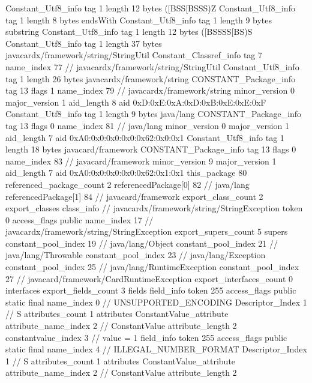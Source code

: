 {{{		}
		Constant_Utf8_info {
			tag	1
			length	12
			bytes	([BSS[BSSS)Z
		}
		Constant_Utf8_info {
			tag	1
			length	8
			bytes	endsWith
		}
		Constant_Utf8_info {
			tag	1
			length	9
			bytes	substring
		}
		Constant_Utf8_info {
			tag	1
			length	12
			bytes	([BSSSS[BS)S
		}
		Constant_Utf8_info {
			tag	1
			length	37
			bytes	javacardx/framework/string/StringUtil
		}
		Constant_Classref_info {
			tag	7
			name_index	77		// javacardx/framework/string/StringUtil
		}
		Constant_Utf8_info {
			tag	1
			length	26
			bytes	javacardx/framework/string
		}
		CONSTANT_Package_info {
			tag	13
			flags	1
			name_index	79		// javacardx/framework/string
			minor_version	0
			major_version	1
			aid_length	8
			aid	0xD:0xE:0xA:0xD:0xB:0xE:0xE:0xF
		}
		Constant_Utf8_info {
			tag	1
			length	9
			bytes	java/lang
		}
		CONSTANT_Package_info {
			tag	13
			flags	0
			name_index	81		// java/lang
			minor_version	0
			major_version	1
			aid_length	7
			aid	0xA0:0x0:0x0:0x0:0x62:0x0:0x1
		}
		Constant_Utf8_info {
			tag	1
			length	18
			bytes	javacard/framework
		}
		CONSTANT_Package_info {
			tag	13
			flags	0
			name_index	83		// javacard/framework
			minor_version	9
			major_version	1
			aid_length	7
			aid	0xA0:0x0:0x0:0x0:0x62:0x1:0x1
		}
	}
	this_package	80
	referenced_package_count	2
	referencedPackage[0]	82		// java/lang
	referencedPackage[1]	84		// javacard/framework
	export_class_count	2
	export_classes {
		class_info {		// javacardx/framework/string/StringException
			token	0
			access_flags	public
			name_index	17		// javacardx/framework/string/StringException
			export_supers_count	5
			supers {
				constant_pool_index	19		// java/lang/Object
				constant_pool_index	21		// java/lang/Throwable
				constant_pool_index	23		// java/lang/Exception
				constant_pool_index	25		// java/lang/RuntimeException
				constant_pool_index	27		// javacard/framework/CardRuntimeException
			}
			export_interfaces_count	0
			interfaces {
			}
			export_fields_count	3
			fields {
			field_info {
				token	255
				access_flags	public static final
				name_index	0		// UNSUPPORTED_ENCODING
				Descriptor_Index	1		// S
				attributes_count	1
				attributes {
				ConstantValue_attribute {
					attribute_name_index	2		// ConstantValue
					attribute_length	2
					constantvalue_index	3		// value = 1
				}
				}
			}
			field_info {
				token	255
				access_flags	public static final
				name_index	4		// ILLEGAL_NUMBER_FORMAT
				Descriptor_Index	1		// S
				attributes_count	1
				attributes {
				ConstantValue_attribute {
					attribute_name_index	2		// ConstantValue
					attribute_length	2
}}}}}}}
